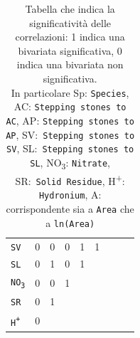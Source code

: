 \documentclass{article} %
\begin{document}
\begin{table}[H]
\begin{tabular}{lcccccccc}
            \texttt{SV} & 0 & 0 & 0 & 1 & 1 &  &&  \\
            \texttt{SL} & 0 & 1 & 0 & 1 &  &  &  \\
            \texttt{NO\textsubscript{3}} & 0 & 0 & 1 &  &  &  & & \\
            \texttt{SR} & 0 & 1 &  &  &  &  &  \\
            \texttt{H\textsuperscript{+}} & 0 &  &  &  &  &  & & \\
        \bottomrule
    \end{tabular}
    \caption{Tabella che indica la significatività delle correlazioni: 1 indica una bivariata significativa, 0 indica una bivariata non significativa. \\
    In particolare Sp: \texttt{Species}, AC: \texttt{Stepping stones to AC}, AP: \texttt{Stepping stones to AP}, SV:\ \texttt{Stepping stones to SV}, SL:\ \texttt{Stepping stones to SL}, NO\textsubscript{3}: \texttt{Nitrate}, SR:\ \texttt{Solid Residue}, H\textsuperscript{+}: \texttt{Hydronium}, A: corrispondente sia a \texttt{Area} che a \texttt{ln(Area)}}
\end{table}
\end{document}
